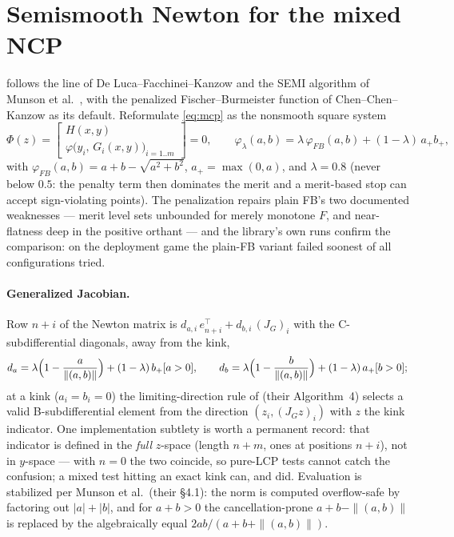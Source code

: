 \section{Semismooth Newton for the mixed NCP}
\label{sec:a-ssn}

 follows the line of De Luca--Facchinei--Kanzow
\cite{deluca2000} and the SEMI algorithm of Munson et al.\
\cite{munson2001}, with the penalized Fischer--Burmeister function of
Chen--Chen--Kanzow \cite{chen2000} as its default. Reformulate
\eqref{eq:mcp} as the nonsmooth square system
\[
\Phi(z) =
\begin{bmatrix} H(x, y)\\ \varphi\bigl(y_i,\, G_i(x,y)\bigr)_{i=1..m}
\end{bmatrix} = 0,
\qquad
\varphi_\lambda(a,b) = \lambda\,\varphi_{FB}(a,b)
+ (1-\lambda)\,a_+ b_+,
\]
with $\varphi_{FB}(a,b) = a + b - \sqrt{a^2+b^2}$, $a_+ = \max(0,a)$, and
$\lambda = 0.8$ (never below $0.5$: the penalty term then dominates the
merit and a merit-based stop can accept sign-violating points). The
penalization repairs plain FB's two documented weaknesses --- merit level
sets unbounded for merely monotone $F$, and near-flatness deep in the
positive orthant \cite{chen2000} --- and the library's own runs confirm
the comparison: on the deployment game the plain-FB variant failed soonest
of all configurations tried.

\paragraph{Generalized Jacobian.} Row $n+i$ of the Newton matrix is
$d_{a,i}\, e_{n+i}^\top + d_{b,i}\, (J_G)_i$ with the C-subdifferential
diagonals, away from the kink,
\[
d_a = \lambda\Bigl(1 - \frac{a}{\|(a,b)\|}\Bigr) + (1-\lambda)\, b_+ [a>0],
\qquad
d_b = \lambda\Bigl(1 - \frac{b}{\|(a,b)\|}\Bigr) + (1-\lambda)\, a_+ [b>0];
\]
at a kink ($a_i = b_i = 0$) the limiting-direction rule of
\cite{chen2000} (their Algorithm~4) selects a valid B-subdifferential
element from the direction $(z_i, (J_G z)_i)$ with $z$ the kink indicator.
One implementation subtlety is worth a permanent record: that indicator
is defined in the \emph{full} $z$-space (length $n+m$, ones at positions
$n+i$), not in $y$-space --- with $n = 0$ the two coincide, so pure-LCP
tests cannot catch the confusion; a mixed test hitting an exact kink can,
and did. Evaluation is stabilized per Munson et al.\ (their \S4.1): the
norm is computed overflow-safe by factoring out $|a|+|b|$, and for
$a+b > 0$ the cancellation-prone $a + b - \|(a,b)\|$ is replaced by the
algebraically equal $2ab/(a + b + \|(a,b)\|)$.

